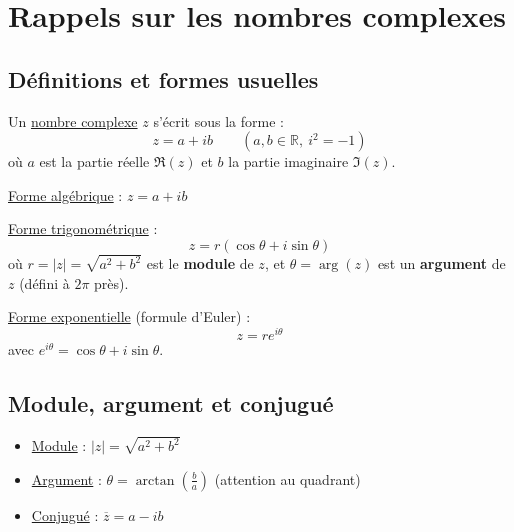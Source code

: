 
\newcommand{\mtn}{\mathbb{N}}
\newcommand{\mtns}{\mathbb{N}^*}
\newcommand{\mtz}{\mathbb{Z}}
\newcommand{\mtr}{\mathbb{R}}
\newcommand{\mtk}{\mathbb{K}}
\newcommand{\mtq}{\mathbb{Q}}
\newcommand{\mtc}{\mathbb{C}}
\newcommand{\mch}{\mathcal{H}}
\newcommand{\mcp}{\mathcal{P}}
\newcommand{\mcb}{\mathcal{B}}
\newcommand{\mcl}{\mathcal{L}}
\newcommand{\mcm}{\mathcal{M}}
\newcommand{\mcc}{\mathcal{C}}
\newcommand{\mcmn}{\mathcal{M}}
\newcommand{\mcmnr}{\mathcal{M}_n(\mtr)}
\newcommand{\mcmnk}{\mathcal{M}_n(\mtk)}
\newcommand{\mcsn}{\mathcal{S}_n}
\newcommand{\mcs}{\mathcal{S}}
\newcommand{\mcd}{\mathcal{D}}
\newcommand{\mcsns}{\mathcal{S}_n^{++}}
\newcommand{\glnk}{GL_n(\mtk)}
\newcommand{\mnr}{\mathcal{M}_n(\mtr)}
\newcommand{\veps}{\varepsilon}
\newcommand{\mcu}{\mathcal{U}}
\newcommand{\mcun}{\mcu_n}
\newcommand{\dis}{\displaystyle}
\newcommand{\croouv}{[\![}
\newcommand{\crofer}{]\!]}
\newcommand{\rab}{\mathcal{R}(a,b)}
\newcommand{\pss}[2]{\langle #1,#2\rangle}


\section*{Rappels sur les nombres complexes}

\subsection*{Définitions et formes usuelles}

Un \underline{nombre complexe} $z$ s'écrit sous la forme :
\[
z = a + ib \qquad (a, b \in \mathbb{R},\ i^2 = -1)
\]
où $a$ est la partie réelle $\Re(z)$ et $b$ la partie imaginaire $\Im(z)$.


\underline{Forme algébrique} : $z = a + ib$

\underline{Forme trigonométrique} : 
\[
z = r(\cos\theta + i\sin\theta)
\]
où $r = |z| = \sqrt{a^2 + b^2}$ est le \textbf{module} de $z$, et $\theta = \arg(z)$ est un \textbf{argument} de $z$ (défini à $2\pi$ près).

\underline{Forme exponentielle} (formule d'Euler) :
\[
z = r e^{i\theta}
\]
avec $e^{i\theta} = \cos\theta + i\sin\theta$.


\subsection*{Module, argument et conjugué}

\begin{itemize}
    \item \underline{Module} : $|z| = \sqrt{a^2 + b^2}$
    \item \underline{Argument} : $\theta = \arctan\left(\frac{b}{a}\right)$ (attention au quadrant)
    \item \underline{Conjugué} : $\overline{z} = a - ib$
\end{itemize}

